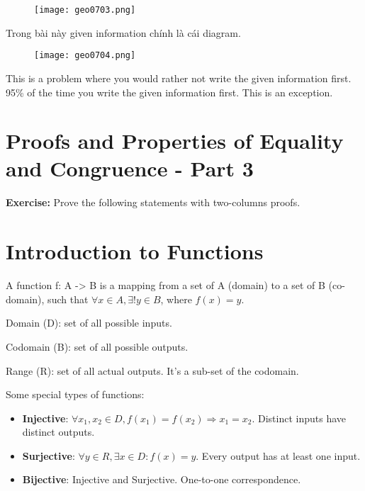 \newpage

\begin{figure}[htb!]
  \centering
  \texttt{[image: geo0703.png]}
\end{figure}

Trong bài này given information chính là cái diagram.

\begin{figure}[htb!]
  \centering
  \texttt{[image: geo0704.png]}
\end{figure}

This is a problem where you would rather not write the given information first. 95\% of the time you write the given information first. This is an exception.

\section{Proofs and Properties of Equality and Congruence - Part 3}

\textbf{Exercise:} Prove the following statements with two-columns proofs.

\section{Introduction to Functions}

A function f: A -> B is a mapping from a set of A (domain) to a set of B (co-domain), such that $\forall x\in A, \exists !y \in B$, where $f(x)=y$.

Domain (D): set of all possible inputs.

Codomain (B): set of all possible outputs.

Range (R): set of all actual outputs. It's a sub-set of the codomain.

Some special types of functions:

\begin{itemize}
  \item \textbf{Injective}: $\forall x_{1}, x_{2}\in D, f(x_{1})=f(x_{2}) \Rightarrow x_{1}=x_{2}$. Distinct inputs have distinct outputs.
  \item \textbf{Surjective}: $\forall y \in R, \exists x \in D : f(x)=y$. Every output has at least one input.
  \item \textbf{Bijective}: Injective and Surjective. One-to-one correspondence.
\end{itemize}

